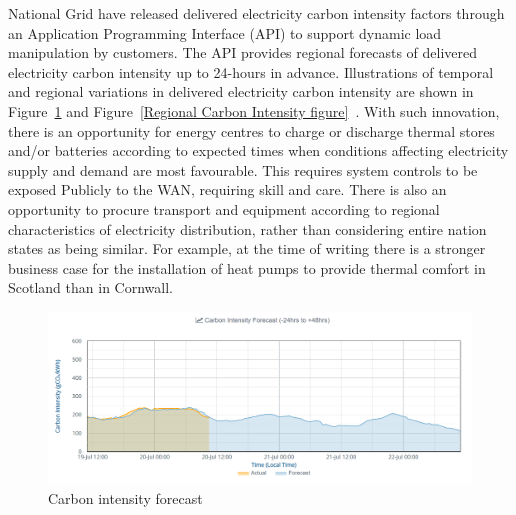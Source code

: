 \documentclass[11pt, oneside]{book}   	%
\begin{document}
National Grid have released delivered electricity carbon intensity factors through an Application Programming Interface (API) to support dynamic load manipulation by customers.
The API provides regional forecasts of delivered electricity carbon intensity up to 24-hours in advance.
Illustrations of temporal and regional variations in delivered electricity carbon intensity are shown in Figure~\ref{Carbon Intensity Forecast figure} and Figure~\ref{Regional Carbon Intensity figure}~\cite{ngrid1}.
With such innovation, there is an opportunity for energy centres to charge or discharge thermal stores and/or batteries according to expected times when conditions affecting electricity supply and demand are most favourable.
This requires system controls to be exposed Publicly to the WAN, requiring skill and care.
There is also an opportunity to procure transport and equipment according to regional characteristics of electricity distribution, rather than considering entire nation states as being similar.
For example, at the time of writing there is a stronger business case for the installation of heat pumps to provide thermal comfort in Scotland than in Cornwall.\

\pagebreak

\FloatBarrier
\begin{figure}
\begin{center}
\includegraphics[width=1\textwidth]{carbonIntensityForecast.png}
\caption{Carbon intensity forecast}
\label{Carbon Intensity Forecast figure}
\end{center}
\end{figure}
\FloatBarrier

\pagebreak
\end{document}
